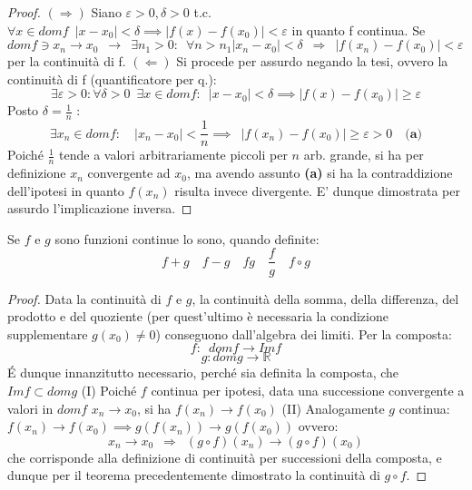 \documentclass[10pt, oneside]{book}
\theoremstyle{plain}
\begin{document}
\begin{proof} $(\Rightarrow)$
Siano $\varepsilon > 0, \delta > 0$ t.c. $\forall x \in domf \enspace |x-x_0| < \delta \implies |f(x) - f(x_0)| < \varepsilon$ in quanto f continua.
Se $domf \owns x_n \rightarrow x_0 \enspace \longrightarrow \enspace \exists n_1 > 0 : \enspace \forall n > n_1 |x_n - x_0| < \delta \enspace \Longrightarrow \enspace |f(x_n) - f(x_0)| < \varepsilon$ per la continuità di f. \newline
$(\Leftarrow)$ Si procede per assurdo negando la tesi, ovvero la continuità di f (quantificatore per q.):
\[\exists \varepsilon > 0 : \forall \delta > 0 \enspace \exists x \in domf : \enspace |x - x_0| < \delta \implies |f(x) - f(x_0)| \geq \varepsilon\]
Posto $\delta = \frac{1}{n}$ :
\[\exists x_n \in domf : \enspace \enspace |x_n - x_0| < \frac{1}{n} \implies \enspace |f(x_n) - f(x_0)| \geq \varepsilon > 0 \quad {\textbf{(a)}}\]
Poiché $\frac{1}{n}$ tende a valori arbitrariamente piccoli per $n$ arb. grande, si ha per definizione $x_n$ convergente ad $x_0$, ma avendo assunto \textbf{(a)} si ha la contraddizione dell'ipotesi in quanto $f(x_n)$ risulta invece divergente.
E' dunque dimostrata per assurdo l'implicazione inversa.
\end{proof}
\begin{ther}
Se $f$ e $g$ sono funzioni continue lo sono, quando definite:
\[f+g \quad f-g \quad fg \quad \frac{f}{g} \quad f \circ g\]
\end{ther}
\begin{proof}
Data la continuità di $f$ e $g$, la continuità della somma, della differenza, del prodotto e del quoziente (per quest'ultimo è necessaria la condizione supplementare $g(x_0) \neq 0$) conseguono dall'algebra dei limiti. 
Per la composta:
\[f : \enspace dom f \longrightarrow Im f\]
\[g : dom g \longrightarrow \mathbb{R}\]
\'E dunque innanzitutto necessario, perché sia definita la composta, che $Im f \subset dom g$ \newline (I) Poiché $f$ continua per ipotesi, data una successione convergente a valori in $domf$ $x_n \longrightarrow x_0$, si ha $f(x_n) \longrightarrow f(x_0)$ \newline (II) Analogamente $g$ continua: $f(x_n) \longrightarrow f(x_0) \implies g(f(x_n)) \longrightarrow g(f(x_0))$ ovvero:
\[x_n \longrightarrow x_0 \enspace \Longrightarrow \enspace (g \circ f) (x_n) \longrightarrow (g \circ f) (x_0)\]
che corrisponde alla definizione di continuità per successioni della composta, e dunque per il teorema precedentemente dimostrato la continuità di $g \circ f$.
\end{proof}
\end{document}
